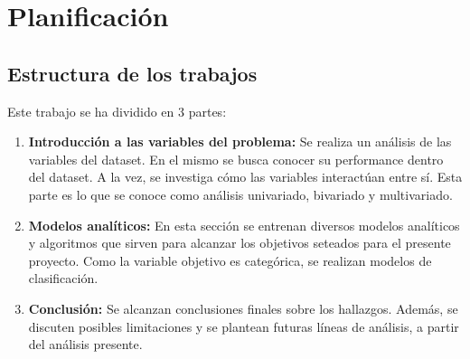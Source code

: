 \documentclass[a4paper]{article}
\begin{document}




\newpage

\section{Planificación}

    \subsection*{Estructura de los trabajos}

        Este trabajo se ha dividido en 3 partes:
        \begin{enumerate}
            \item \textbf{Introducción a las variables del problema:} Se realiza un análisis de las variables del dataset. En el mismo se busca conocer su performance dentro del dataset. A la vez, se investiga cómo las variables interactúan entre sí. Esta parte es lo que se conoce como análisis univariado, bivariado y multivariado.
            \item \textbf{Modelos analíticos:} En esta sección se entrenan diversos modelos analíticos y algoritmos que sirven para alcanzar los objetivos seteados para el presente proyecto. Como la variable objetivo es categórica, se realizan modelos de clasificación.
            \item \textbf{Conclusión:} Se alcanzan conclusiones finales sobre los hallazgos. Además, se discuten posibles limitaciones y se plantean futuras líneas de análisis, a partir del análisis presente.
            
        \end{enumerate}
\end{document}
